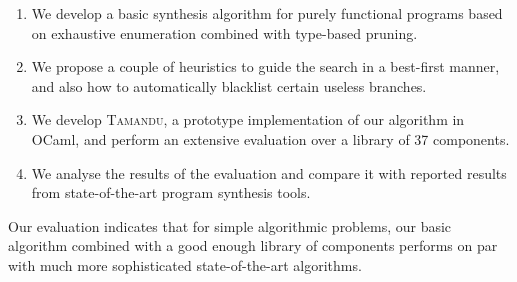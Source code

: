 \begin{enumerate}
\item We develop a basic synthesis algorithm for purely functional programs based on exhaustive enumeration combined with type-based pruning.

\item We propose a couple of heuristics to guide the search in a best-first manner, and also how to automatically blacklist certain useless branches.

\item We develop \textsc{Tamandu}, a prototype implementation of our algorithm in OCaml, and perform an extensive evaluation over a library of 37 components.

\item We analyse the results of the evaluation and compare it with reported results from state-of-the-art program synthesis tools.
\end{enumerate}  

Our evaluation indicates that for simple algorithmic problems, our basic algorithm combined with a good enough library of components performs on par with much more sophisticated state-of-the-art algorithms.
